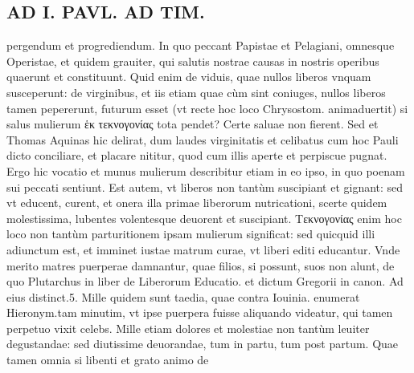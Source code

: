 \documentclass{article}
\begin{document}
\begin{pages}
\section*{AD I. PAVL. AD TIM. }
\marginpar{[ p.90 ]}\pstart pergendum et progrediendum. In quo peccant Papistae et Pelagiani, omnesque Operistae, et quidem grauiter, qui salutis nostrae causas in nostris operibus quaerunt et constituunt. Quid enim de viduis, quae nullos liberos vnquam susceperunt: de virginibus, et iis etiam quae cùm sint coniuges, nullos liberos tamen pepererunt, futurum esset (vt recte hoc loco Chrysostom. animaduertit) si salus mulierum ἑκ τεκνογονίας tota pendet? Certe saluae non fierent. Sed et Thomas Aquinas hic delirat, dum laudes virginitatis et celibatus cum hoc Pauli dicto conciliare, et placare nititur, quod cum illis aperte et perpiscue pugnat. Ergo hic vocatio et munus mulierum describitur etiam in eo ipso, in quo poenam sui peccati sentiunt. Est autem, vt liberos non tantùm suscipiant et gignant: sed vt educent, curent, et onera illa primae liberorum nutricationi, scerte quidem molestissima, lubentes volentesque deuorent et suscipiant. Tεκνογονίας enim hoc loco non tantùm parturitionem ipsam mulierum significat: sed quicquid illi adiunctum est, et imminet iustae matrum curae, vt liberi editi educantur. Vnde merito matres puerperae damnantur, quae filios, si possunt, suos non alunt, de quo Plutarchus in liber  de Liberorum Educatio. et dictum Gregorii in canon. Ad eius distinct.5. Mille quidem sunt taedia, quae contra Iouinia. enumerat Hieronym.tam minutim, vt ipse puerpera fuisse aliquando videatur, qui tamen perpetuo vixit celebs. Mille etiam dolores et molestiae non tantùm leuiter degustandae: sed diutissime deuorandae, tum in partu, tum post partum. Quae tamen omnia si libenti et grato animo de\pend

\end{pages}
\end{document}

